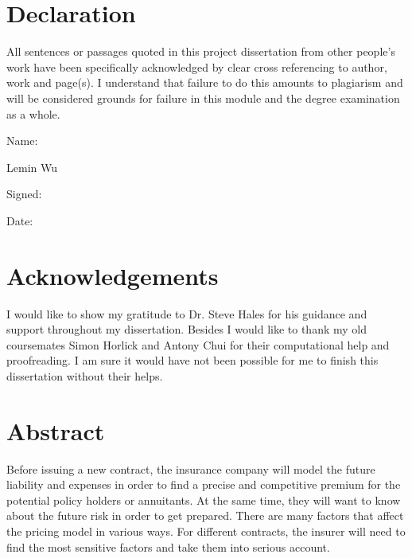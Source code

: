 \documentclass{report}
\begin{document}
\chapter*{Declaration}                %
All sentences or passages quoted in this project dissertation from other
people's work have been specifically acknowledged by clear cross referencing
to author, work and page(s).  I understand that failure to do this amounts
to plagiarism and will be considered grounds for failure in this module and
the degree examination as a whole.

\bigskip

\noindent
Name:

Lemin Wu\\


\bigskip

\noindent
Signed:


\bigskip

\noindent
Date:



\chapter*{Acknowledgements}


I would like to show my gratitude to Dr. Steve Hales for his guidance and support throughout my dissertation. Besides I would like to thank my old coursemates Simon Horlick and Antony Chui for their computational help and proofreading. I am sure it would have not been possible for me to finish this dissertation without their helps.


\chapter*{Abstract}

Before issuing a new contract, the insurance company will model the future
liability and expenses in order to find a precise and competitive premium for
the potential policy holders or annuitants. At the same time, they will want to
know about the future risk in order to get prepared. There are many factors
that affect the pricing model in various ways. For different contracts, the
insurer will need to find the most sensitive factors and take them into serious
account. 
\end{document}
